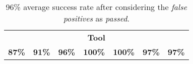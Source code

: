 
\begin{table*}
\centering
\begin{tabular}{|c|c|c|c|c|c|c|}

\headrow{EY Review} &
\headrow{Smart Check} &
\headrow{Securify} &
\headrow{MythX (Mythril)} &
\headrow{Contract Guard} &
\headrow{Slither} &
\headrow{Odin} \\ \hline

\multicolumn{7}{|c|}{\textbf{Tool}} \\
\hline
\textbf{87\%} & \textbf{91\%} & \textbf{96\%} & \textbf{100\%} & \textbf{100\%} & \textbf{97\%} & \textbf{97\%} \\
			\hline
\end{tabular}


\caption{96\% average success rate after considering the \textit{false positives} as \textit{passed}.\label{tab:result4}}
	
\end{table*}

